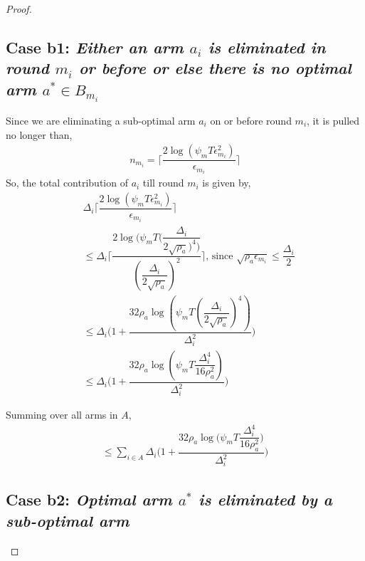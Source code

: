 \begin{proof}
\subsection*{Case b1: \textit{Either an arm $a_{i}$ is eliminated in round $m_{i}$ or before or else there is no optimal arm $a^{*}\in B_{m_{i}}$ }}
 Since we are eliminating a sub-optimal arm $a_{i}$ on or before round $m_{i}$, it is pulled no longer than, 
 \begin{align*}
 n_{m_{i}}=\bigg\lceil\dfrac{2\log{(\psi_{m}T\epsilon_{m_{i}}^{2})}}{\epsilon_{m_{i}}}\bigg\rceil
 \end{align*}
So, the total contribution of $a_{i}$  till round $m_{i}$ is given by, 
\begin{align*}
&\Delta_{i}\bigg\lceil\dfrac{2\log{(\psi_{m}T\epsilon_{m_{i}}^{2})}}{\epsilon_{m_{i}}}\bigg\rceil\\
&\leq\Delta_{i}\bigg\lceil\dfrac{2\log{(\psi_{m}T(\dfrac{\Delta_{i}}{2\sqrt{\rho_{a}})^{4})}}}{(\dfrac{\Delta_{i}}{2\sqrt{\rho_{a}}})^{2}}\bigg\rceil \text{, since } \sqrt{\rho_{a}\epsilon_{m_{i}}}\leq\dfrac{\Delta_{i}}{2}\\
&\leq\Delta_{i}\bigg(1+\dfrac{32\rho_{a}\log{(\psi_{m}T(\dfrac{\Delta_{i}}{2\sqrt{\rho_{a}}})^{4})}}{\Delta_{i}^{2}}\bigg)
\\
&\leq\Delta_{i}\bigg(1+\dfrac{32\rho_{a}\log{(\psi_{m}T\dfrac{\Delta_{i}^{4}}{16\rho_{a}^{2}})}}{\Delta_{i}^{2}}\bigg)
\end{align*} 
 
Summing over all arms in $A$, 
\begin{align*}
\leq\sum_{i\in A}\Delta_{i}\bigg(1+\dfrac{32\rho_{a}\log{(\psi_{m}T\dfrac{\Delta_{i}^{4}}{16\rho_{a}^{2}}})}{\Delta_{i}^{2}}\bigg)
\end{align*}

\subsection*{Case b2: \textit{Optimal arm $a^{*}$ is eliminated by a sub-optimal arm  }}



\end{proof}
